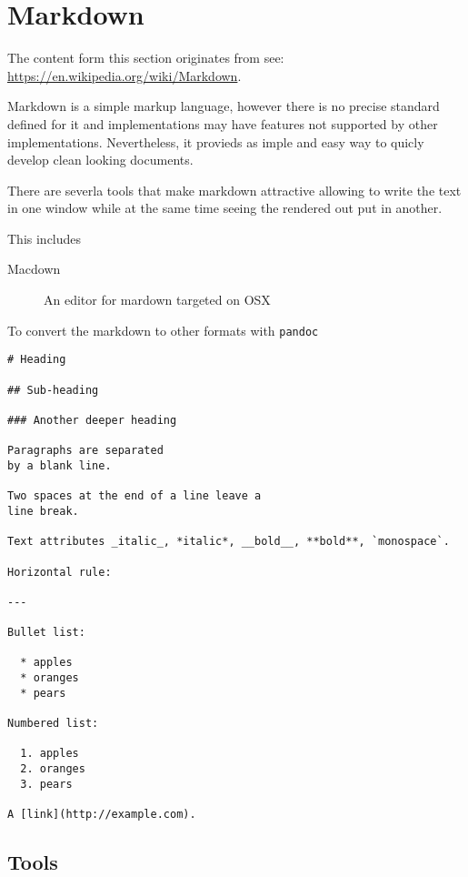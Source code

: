 \FILENAME

\section{Markdown}\label{S:markdown}

The content form this section originates from see:
\url{https://en.wikipedia.org/wiki/Markdown}.

Markdown is a simple markup language, however there is no precise
standard defined for it and implementations may have features not
supported by other implementations. Nevertheless, it provieds as imple
and easy way to quicly develop clean looking documents.

There are severla tools that make markdown attractive allowing to
write the text in one window while at the same time seeing the
rendered out put in another.

This includes

\begin{description}

\item[Macdown] An editor for mardown targeted on OSX

\end{description}

To convert the markdown to other formats with \verb|pandoc|

\begin{verbatim}
# Heading

## Sub-heading

### Another deeper heading
 
Paragraphs are separated
by a blank line.

Two spaces at the end of a line leave a  
line break.

Text attributes _italic_, *italic*, __bold__, **bold**, `monospace`.

Horizontal rule:

---

Bullet list:

  * apples
  * oranges
  * pears

Numbered list:

  1. apples
  2. oranges
  3. pears

A [link](http://example.com).

\end{verbatim}

\subsection{Tools}

